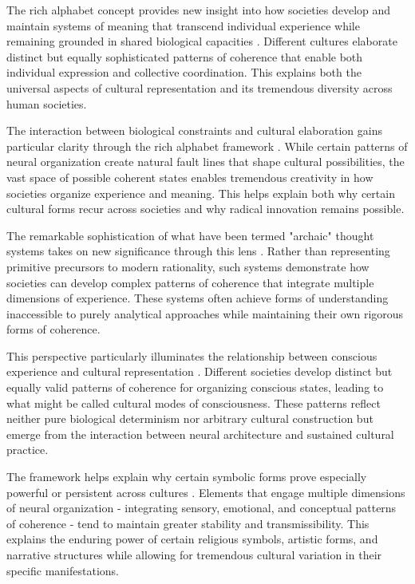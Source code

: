 The rich alphabet concept provides new insight into how societies develop and maintain systems of meaning that transcend individual experience while remaining grounded in shared biological capacities \cite{rappaport1999ritual}. Different cultures elaborate distinct but equally sophisticated patterns of coherence that enable both individual expression and collective coordination. This explains both the universal aspects of cultural representation and its tremendous diversity across human societies.

The interaction between biological constraints and cultural elaboration gains particular clarity through the rich alphabet framework \cite{descola2013beyond}. While certain patterns of neural organization create natural fault lines that shape cultural possibilities, the vast space of possible coherent states enables tremendous creativity in how societies organize experience and meaning. This helps explain both why certain cultural forms recur across societies and why radical innovation remains possible.

The remarkable sophistication of what have been termed "archaic" thought systems takes on new significance through this lens \cite{turner1967forest}. Rather than representing primitive precursors to modern rationality, such systems demonstrate how societies can develop complex patterns of coherence that integrate multiple dimensions of experience. These systems often achieve forms of understanding inaccessible to purely analytical approaches while maintaining their own rigorous forms of coherence.

This perspective particularly illuminates the relationship between conscious experience and cultural representation \cite{jung1968archetypes}. Different societies develop distinct but equally valid patterns of coherence for organizing conscious states, leading to what might be called cultural modes of consciousness. These patterns reflect neither pure biological determinism nor arbitrary cultural construction but emerge from the interaction between neural architecture and sustained cultural practice.

The framework helps explain why certain symbolic forms prove especially powerful or persistent across cultures \cite{armstrong1981powers}. Elements that engage multiple dimensions of neural organization - integrating sensory, emotional, and conceptual patterns of coherence - tend to maintain greater stability and transmissibility. This explains the enduring power of certain religious symbols, artistic forms, and narrative structures while allowing for tremendous cultural variation in their specific manifestations.

